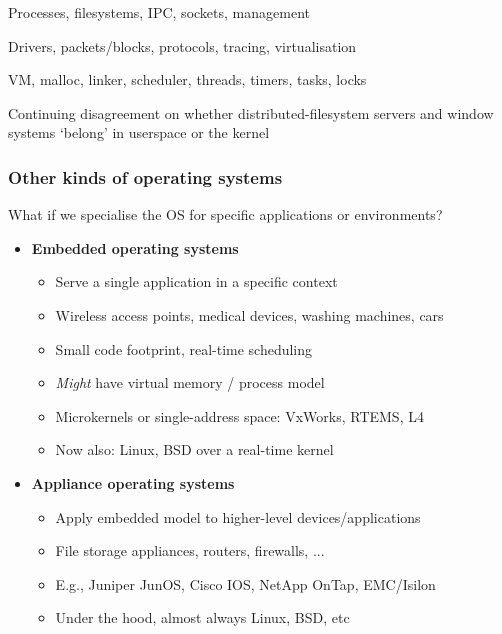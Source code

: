 \begin{frame}
\begin{description}
      \smallskip

      Processes, filesystems, IPC, sockets, management

      \smallskip

      Drivers, packets/blocks, protocols, tracing, virtualisation

      \smallskip

      VM, malloc, linker, scheduler, threads, timers, tasks, locks

  \end{description}

  \pause

  \medskip

  Continuing disagreement on whether distributed-filesystem servers and
  window systems `belong' in userspace or the kernel
\end{frame}

\begin{frame}
  \frametitle{Other kinds of operating systems}

  \bigskip
  What if we specialise the OS for specific applications or environments?

  \pause
  \bigskip
  \begin{itemize}
    \item \textbf{Embedded operating systems}
    \begin{itemize}
      \item Serve a single application in a specific context
      \item Wireless access points, medical devices, washing machines, cars
      \item Small code footprint, real-time scheduling
      \item \textit{Might} have virtual memory / process model
      \item Microkernels or single-address space: VxWorks, RTEMS, L4
      \item Now also: Linux, BSD over a real-time kernel
    \end{itemize}

    \pause
    \bigskip

    \item \textbf{Appliance operating systems}
    \begin{itemize}
      \item Apply embedded model to higher-level devices/applications
      \item File storage appliances, routers, firewalls, ...
      \item E.g., Juniper JunOS, Cisco IOS, NetApp OnTap, EMC/Isilon
      \item Under the hood, almost always Linux, BSD, etc
    \end{itemize}
  \end{itemize}
\end{frame}

